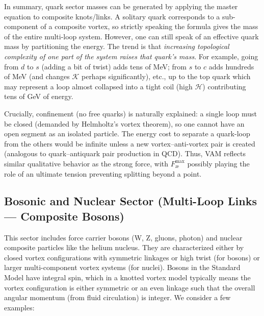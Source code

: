     In summary, quark sector masses can be generated by applying the master equation to composite knots/links. A solitary quark corresponds to a sub-component of a composite vortex, so strictly speaking the formula gives the mass of the entire multi-loop system. However, one can still speak of an effective quark mass by partitioning the energy. The trend is that \textit{increasing topological complexity of one part of the system raises that quark’s mass}. For example, going from $d$ to $s$ (adding a bit of twist) adds tens of MeV; from $s$ to $c$ adds hundreds of MeV (and changes $\mathcal{K}$ perhaps significantly), etc., up to the top quark which may represent a loop almost collapsed into a tight coil (high $\mathcal{H}$) contributing tens of GeV of energy.

    Crucially, confinement (no free quarks) is naturally explained: a single loop must be closed (demanded by Helmholtz’s vortex theorem), so one cannot have an open segment as an isolated particle. The energy cost to separate a quark-loop from the others would be infinite unless a new vortex–anti-vortex pair is created (analogous to quark–antiquark pair production in QCD). Thus, VAM reflects similar qualitative behavior as the strong force, with $F^{\max}_{\text{\ae}}$ possibly playing the role of an ultimate tension preventing splitting beyond a point.

    \subsection{Bosonic and Nuclear Sector (Multi-Loop Links — Composite Bosons)}

    This sector includes force carrier bosons (W, Z, gluons, photon) and nuclear composite particles like the helium nucleus. They are characterized either by closed vortex configurations with symmetric linkages or high twist (for bosons) or larger multi-component vortex systems (for nuclei). Bosons in the Standard Model have integral spin, which in a knotted vortex model typically means the vortex configuration is either symmetric or an even linkage such that the overall angular momentum (from fluid circulation) is integer. We consider a few examples:

